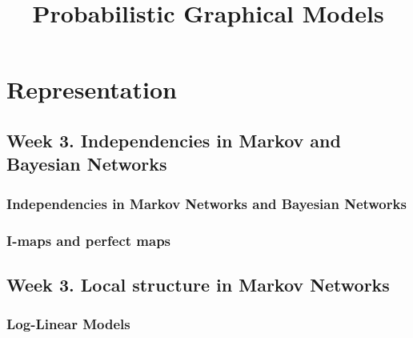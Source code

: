 \documentclass[a4paper,10pt]{article}
\title{Probabilistic Graphical Models}
\author{}
\begin{document}
\maketitle

\section{Representation}

\subsection{Week 3. Independencies in Markov and Bayesian Networks}

\subsubsection{Independencies in Markov Networks and Bayesian Networks}



\subsubsection{I-maps and perfect maps}



\subsection{Week 3. Local structure in Markov Networks}

\subsubsection{Log-Linear Models}


\end{document}
